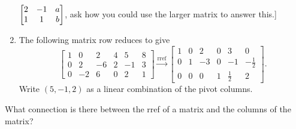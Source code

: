 \begin{problem}
\begin{enumerate}
$\begin{bmatrix}
\begin{matrix} 2\\1 \end{matrix}&
\begin{matrix} -1\\1 \end{matrix}&
\begin{matrix} a\\b \end{matrix}
\end{bmatrix}
$, ask how you could use the larger matrix to answer this.]
\item The following matrix row reduces to give
$$\begin{bmatrix}
1 & 0 & 2 & 4 & 5 & 8 \\
0 & 2 & -6 & 2 & -1 & 3 \\
0 & -2 & 6 & 0 & 2 & 1
\end{bmatrix}
\xrightarrow{\text{rref}}
\begin{bmatrix}
1 & 0 & 2 & 0 & 3 & 0 \\
0 & 1 & -3 & 0 & -1 & -\frac{1}{2} \\
0 & 0 & 0 & 1 & \frac{1}{2} & 2
\end{bmatrix}
.$$
Write $(5,-1,2)$ as a linear combination of the pivot columns.
\end{enumerate}
 
\end{problem}

\begin{question}
 What connection is there between the rref of a matrix and the columns of the matrix?
\end{question}

